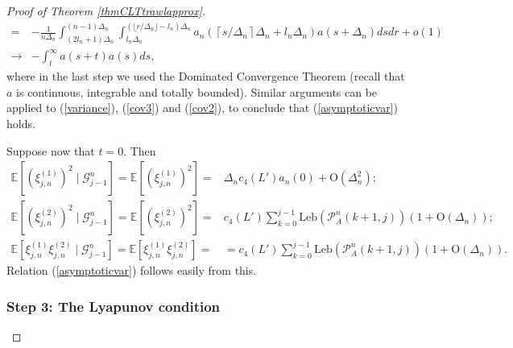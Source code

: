 \documentclass{article}
\theoremstyle{plain}
\theoremstyle{definition}
\theoremstyle{remark}
\newcommand{\Leb}{\ensuremath{\mathrm{Leb}}}
\begin{document}
\begin{appendix}
\begin{proof}[Proof of Theorem  \ref{thmCLTtrawlapprox}]
\begin{equation}
\begin{aligned}
			= & -\frac{1}{n\Delta_{n}}\int_{(2l_{n}+1)\Delta_{n}}^{(n-1)\Delta_{n}}\int_{l_{n}\Delta_{n}}^{( \lfloor r/\Delta_{n} \rfloor-l_{n})\Delta_{n}}a_{n}(\left\lceil s/\Delta_{n}\right\rceil \Delta_{n}+l_{n}\Delta_{n})a(s+\Delta_{n})dsdr+o(1)\\
			\rightarrow & -\int_{t}^{\infty}a(s+t)a(s)ds,
		\end{aligned}
	\end{equation}
	where in the last step we  used the Dominated Convergence Theorem
	(recall that $a$ is continuous, integrable and totally bounded).
	Similar arguments can be applied to (\ref{variance}), (\ref{cov3})
	and (\ref{cov2}), to conclude that
	(\ref{asymptoticvar}) holds.
	
	Suppose now that $t=0$. Then
	\begin{align*}
		\mathbb{E}[(\xi_{j,n}^{(1)})^{2}\mid\mathscr{G}_{j-1}^{n}]=\mathbb{E}[(\xi_{j,n}^{(1)})^{2}]=&\Delta_{n}c_{4}(L')a_{n}(0)+\mathrm{O}(\Delta_{n}^{2});\\
		\mathbb{E}[(\xi_{j,n}^{(2)})^{2}\mid\mathscr{G}_{j-1}^{n}]=\mathbb{E}[(\xi_{j,n}^{(2)})^{2}]=&c_{4}(L')\sum_{k=0}^{j-1}\Leb(\mathcal{P}_{A}^{n}(k+1,j))(1+\mathrm{O}(\Delta_{n}));\\
		\mathbb{E}[\xi_{j,n}^{(1)}\xi_{j,n}^{(2)}\mid\mathscr{G}_{j-1}^{n}]=\mathbb{E}[\xi_{j,n}^{(1)}\xi_{j,n}^{(2)}]=&=c_{4}(L')\sum_{k=0}^{j-1}\Leb(\mathcal{P}_{A}^{n}(k+1,j))(1+\mathrm{O}(\Delta_{n})).
	\end{align*}
	Relation (\ref{asymptoticvar}) follows easily from this.
	
	\subsubsection*{Step 3: The Lyapunov condition}
  	

\end{proof}
\end{appendix}
\end{document}
